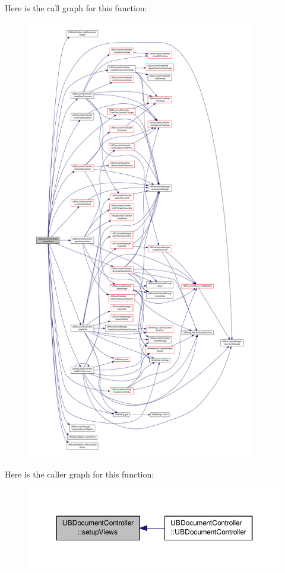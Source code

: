 Here is the call graph for this function\-:
\nopagebreak
\begin{figure}[H]
\begin{center}
\leavevmode
\includegraphics[height=550pt]{d6/de0/class_u_b_document_controller_abb172787a34a34cd3c2df0a1b46918c5_cgraph}
\end{center}
\end{figure}




Here is the caller graph for this function\-:
\nopagebreak
\begin{figure}[H]
\begin{center}
\leavevmode
\includegraphics[width=350pt]{d6/de0/class_u_b_document_controller_abb172787a34a34cd3c2df0a1b46918c5_icgraph}
\end{center}
\end{figure}


